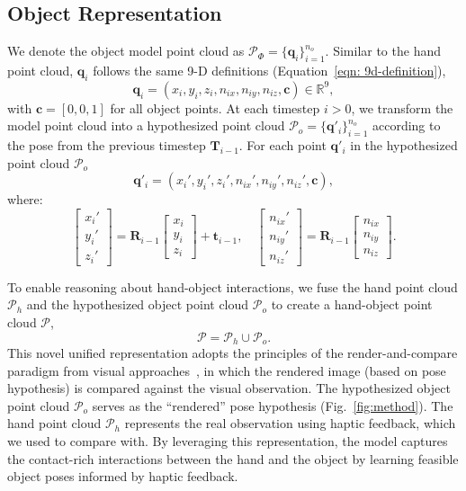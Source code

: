 \documentclass[11pt, a4paper, logo, twocolumn]{brown}
\begin{document}
\subsection{Object Representation}
We denote the object model point cloud as $\mathcal{P}_\Phi = \{ \mathbf{q}_i \}_{i=1}^{n_o}$.
Similar to the hand point cloud, $\mathbf{q}_i$ follows the same 9-D definitions (Equation~\ref{eqn: 9d-definition}),
\begin{equation*}
    \mathbf{q}_i = (x_i, y_i, z_i, n_{ix}, n_{iy}, n_{iz}, \mathbf{c}) \in \mathbb{R}^9,
\end{equation*}
with $\mathbf{c} = [0, 0, 1]$ for all object points.
At each timestep $i>0$, we transform the model point cloud into a hypothesized point cloud $\mathcal{P}_o = \{ \mathbf{q}'_i \}_{i=1}^{n_o}$ according to the pose from the previous timestep $\mathbf{T}_{i-1}$.
For each point $\mathbf{q}'_i$ in the hypothesized point cloud $\mathcal{P}_o$
\begin{equation}
    \mathbf{q}'_i = (x_i', y_i', z_i', n_{ix}', n_{iy}', n_{iz}', \mathbf{c}),
\end{equation}
where:
\begin{equation}
    \begin{bmatrix} x_i' \\ y_i' \\ z_i' \end{bmatrix} = \mathbf{R}_{i-1} \begin{bmatrix} x_i \\ y_i \\ z_i \end{bmatrix} + \mathbf{t}_{i-1}, \quad
    \begin{bmatrix} n_{ix}' \\ n_{iy}' \\ n_{iz}' \end{bmatrix} = \mathbf{R}_{i-1} \begin{bmatrix} n_{ix} \\ n_{iy} \\ n_{iz} \end{bmatrix}.
\end{equation}

To enable reasoning about hand-object interactions, we fuse the hand point cloud $\mathcal{P}_h$ and the hypothesized object point cloud $\mathcal{P}_o$ to create a hand-object point cloud $\mathcal{P}$,
\begin{equation}
    \mathcal{P} = \mathcal{P}_h \cup \mathcal{P}_o.
\end{equation}
This novel unified representation adopts the principles of the render-and-compare paradigm from visual approaches~\cite{li_deepim_2018, wen_se3-tracknet_2020, labbe_megapose_2022, wen_foundationpose_2024, tremblay_diff-dope_2023}, in which the rendered image (based on pose hypothesis) is compared against the visual observation.
The hypothesized object point cloud $\mathcal{P}_o$ serves as the ``rendered'' pose hypothesis (Fig.~\ref{fig:method}).
The hand point cloud $\mathcal{P}_h$ represents the real observation using haptic feedback, which we used to compare with.
By leveraging this representation, the model captures the contact-rich interactions between the hand and the object by learning feasible object poses informed by haptic feedback. 
\end{document}
